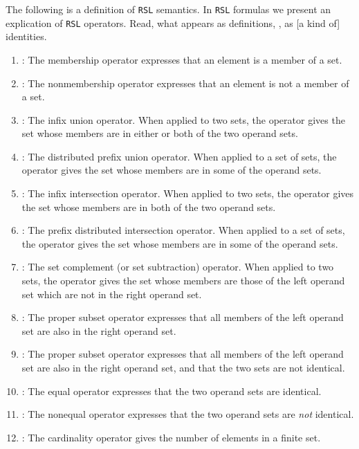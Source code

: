 \hhhh

The following is  a definition of \texttt{RSL} semantics.
In  \texttt{RSL} formulas we present an explication of  \texttt{RSL}
operators. Read, what appears as definitions, {\IS}, as [a kind of]
identities. 

\begin{enumerate}\setei
\item{\ISIN:}\label{tseb.rsl.so1} The membership operator expresses that an
  element is 
  a member of a set. 
\item \NOTISIN:\label{tseb.rsl.so2} The nonmembership operator expresses that an
  element is not a member of a set. 
\item{\UNION:}\label{tseb.rsl.so3} The infix union operator. When applied to
        two sets, the operator gives 
        the set whose members are in either or both of the two operand 
        sets.
\item{\UNION:}\label{tseb.rsl.so4} The distributed prefix union operator. When
        applied to a set of sets, the 
        operator gives 
        the set whose members are in some of the operand sets.
\item{\INTER:}\label{tseb.rsl.so5} The infix intersection operator. When applied to two
  sets, the operator gives the set whose members are in both of the
  two operand sets. 
\item{\INTER:}\label{tseb.rsl.so6} The prefix distributed intersection
  operator. When applied to a set of  
  sets, the operator gives the set whose members are in some of the
  operand sets. 
                             
\mnewfoil
  
\item{\SETMINUS:}\label{tseb.rsl.so7} The set complement (or set subtraction)
  operator. When applied to two sets, the operator gives the set whose
  members are those of the left operand set which are not in the right
  operand set.  
\item{\SUBSETEQ:}\label{tseb.rsl.so8} The proper subset operator expresses that
  all members 
  of the left operand set are also in the right operand set. 
\item{\SUBSET:}\label{tseb.rsl.so9} The proper subset operator expresses that
  all members 
  of the left operand set are also in the right operand set, and that
  the two sets are not identical. 
\item{\EQ:}\label{tseb.rsl.so10} The equal operator expresses that the two
  operand sets are identical.  
\item{\NOTEQ:}\label{tseb.rsl.so11} The nonequal operator expresses that the two operand
  sets are \emph{not} identical.  
\item{:}\label{tseb.rsl.so12} The cardinality operator gives the number
  of elements 
  in a finite set. 
\savei\end{enumerate}

